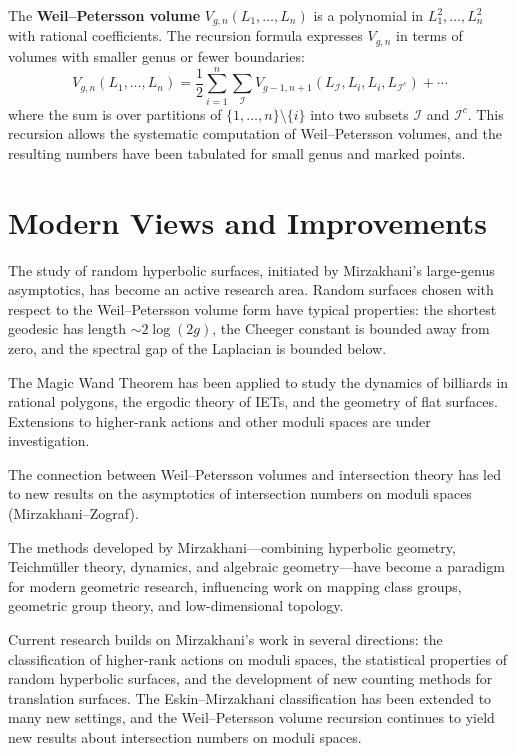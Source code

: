 The \textbf{Weil--Petersson volume} $V_{g,n}(L_1,\ldots,L_n)$ is a polynomial in $L_1^2,\ldots,L_n^2$ with rational coefficients. The recursion formula expresses $V_{g,n}$ in terms of volumes with smaller genus or fewer boundaries:
\[
V_{g,n}(L_1,\ldots,L_n) = \frac{1}{2}\sum_{i=1}^n \sum_{\mathcal{I}} V_{g-1,n+1}(L_{\mathcal{I}}, L_i, L_i, L_{\mathcal{I}^c}) + \cdots
\]
where the sum is over partitions of $\{1,\ldots,n\}\setminus\{i\}$ into two subsets $\mathcal{I}$ and $\mathcal{I}^c$. This recursion allows the systematic computation of Weil--Petersson volumes, and the resulting numbers have been tabulated for small genus and marked points.

\section{Modern Views and Improvements}

The study of random hyperbolic surfaces, initiated by Mirzakhani's large-genus asymptotics, has become an active research area. Random surfaces chosen with respect to the Weil--Petersson volume form have typical properties: the shortest geodesic has length $\sim 2\log(2g)$, the Cheeger constant is bounded away from zero, and the spectral gap of the Laplacian is bounded below.

The Magic Wand Theorem has been applied to study the dynamics of billiards in rational polygons, the ergodic theory of IETs, and the geometry of flat surfaces. Extensions to higher-rank actions and other moduli spaces are under investigation.

The connection between Weil--Petersson volumes and intersection theory has led to new results on the asymptotics of intersection numbers on moduli spaces (Mirzakhani--Zograf).

The methods developed by Mirzakhani---combining hyperbolic geometry, Teichm\"uller theory, dynamics, and algebraic geometry---have become a paradigm for modern geometric research, influencing work on mapping class groups, geometric group theory, and low-dimensional topology.

Current research builds on Mirzakhani's work in several directions: the classification of higher-rank actions on moduli spaces, the statistical properties of random hyperbolic surfaces, and the development of new counting methods for translation surfaces. The Eskin--Mirzakhani classification has been extended to many new settings, and the Weil--Petersson volume recursion continues to yield new results about intersection numbers on moduli spaces.

